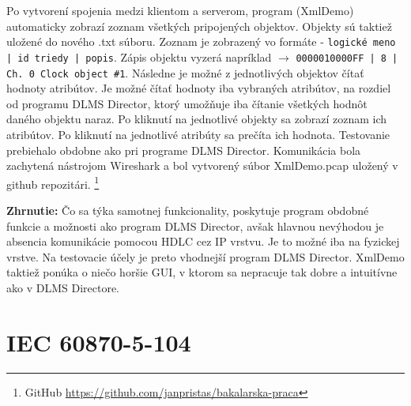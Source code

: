 Po vytvorení spojenia medzi klientom a serverom, program (XmlDemo) automaticky zobrazí zoznam všetkých pripojených objektov. Objekty sú taktiež uložené do nového .txt súboru. Zoznam je zobrazený vo formáte - {\tt logické meno | id triedy | popis}. Zápis objektu vyzerá napríklad $\rightarrow$ {\tt 0000010000FF | 8 | Ch. 0 Clock object \#1}. Následne je možné z jednotlivých objektov čítať hodnoty atribútov. Je možné čítať hodnoty iba vybraných atribútov, na rozdiel od programu DLMS Director, ktorý umožňuje iba čítanie všetkých hodnôt daného objektu naraz. Po kliknutí na jednotlivé objekty sa zobrazí zoznam ich atribútov. Po kliknutí na jednotlivé atribúty sa prečíta ich hodnota. Testovanie prebiehalo obdobne ako pri programe DLMS Director. Komunikácia bola zachytená nástrojom Wireshark a bol vytvorený súbor XmlDemo.pcap uložený v github repozitári. \footnote{GitHub \url{https://github.com/janpristas/bakalarska-praca}} \par
\noindent \textbf{Zhrnutie:} Čo sa týka samotnej funkcionality, poskytuje program obdobné funkcie a možnosti ako program DLMS Director, avšak hlavnou nevýhodou je absencia komunikácie pomocou HDLC cez IP vrstvu. Je to možné iba na fyzickej vrstve. Na testovacie účely je preto vhodnejší program DLMS Director. XmlDemo taktiež ponúka o niečo horšie GUI, v ktorom sa nepracuje tak dobre a intuitívne ako v DLMS Directore.

\section{IEC 60870-5-104}
